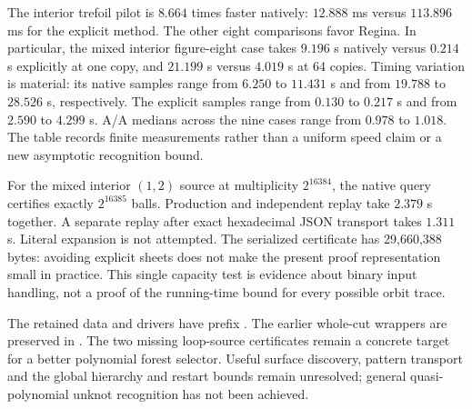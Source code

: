 

The interior trefoil pilot is $8.664$ times faster natively: $12.888$ ms
versus $113.896$ ms for the explicit method. The other eight comparisons
favor Regina. In particular, the mixed interior figure-eight case takes
$9.196$ s natively versus $0.214$ s explicitly at one copy, and $21.199$ s
versus $4.019$ s at 64 copies. Timing variation is material: its native
samples range from $6.250$ to $11.431$ s and from $19.788$ to $28.526$ s,
respectively. The explicit samples range from $0.130$ to $0.217$ s and from
$2.590$ to $4.299$ s. A/A medians across the nine cases range from $0.978$
to $1.018$. The table records finite measurements rather than a uniform
speed claim or a new asymptotic recognition bound.

For the mixed interior $(1,2)$ source at multiplicity $2^{16384}$, the native
query certifies exactly $2^{16385}$ balls. Production and independent replay
take $2.379$ s together. A separate replay after exact hexadecimal JSON
transport takes $1.311$ s. Literal expansion is not attempted. The serialized
certificate has 29,660,388 bytes: avoiding explicit sheets does not make the
present proof representation small in practice. This single capacity test
is evidence about binary input handling, not a proof of the running-time
bound for every possible orbit trace.

The retained data and drivers have prefix .
The earlier whole-cut wrappers are preserved in
. The two missing loop-source certificates
remain a concrete target for a better polynomial forest selector. Useful
surface discovery, pattern transport and the global hierarchy and restart
bounds remain unresolved; general quasi-polynomial unknot recognition has
not been achieved.
